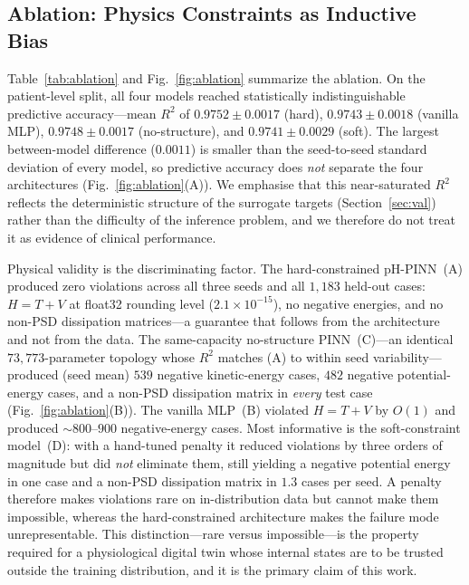 \documentclass[journal]{IEEEtran}
\begin{document}

\subsection{Ablation: Physics Constraints as Inductive Bias}\label{sec:ablres}
Table~\ref{tab:ablation} and Fig.~\ref{fig:ablation} summarize the ablation. On the patient-level split, all four models reached statistically indistinguishable predictive accuracy---mean $R^2$ of $0.9752\pm0.0017$ (hard), $0.9743\pm0.0018$ (vanilla MLP), $0.9748\pm0.0017$ (no-structure), and $0.9741\pm0.0029$ (soft). The largest between-model difference ($0.0011$) is smaller than the seed-to-seed standard deviation of every model, so predictive accuracy does \emph{not} separate the four architectures (Fig.~\ref{fig:ablation}(A)). We emphasise that this near-saturated $R^2$ reflects the deterministic structure of the surrogate targets (Section~\ref{sec:val}) rather than the difficulty of the inference problem, and we therefore do not treat it as evidence of clinical performance.

Physical validity is the discriminating factor. The hard-constrained pH-PINN~(A) produced zero violations across all three seeds and all $1{,}183$ held-out cases: $H=T+V$ at float32 rounding level ($2.1\times10^{-15}$), no negative energies, and no non-PSD dissipation matrices---a guarantee that follows from the architecture and not from the data. The same-capacity no-structure PINN~(C)---an identical $73{,}773$-parameter topology whose $R^2$ matches (A) to within seed variability---produced (seed mean) $539$ negative kinetic-energy cases, $482$ negative potential-energy cases, and a non-PSD dissipation matrix in \emph{every} test case (Fig.~\ref{fig:ablation}(B)). The vanilla MLP~(B) violated $H=T+V$ by $O(1)$ and produced ${\sim}800$--$900$ negative-energy cases. Most informative is the soft-constraint model~(D): with a hand-tuned penalty it reduced violations by three orders of magnitude but did \emph{not} eliminate them, still yielding a negative potential energy in one case and a non-PSD dissipation matrix in $1.3$ cases per seed. A penalty therefore makes violations rare on in-distribution data but cannot make them impossible, whereas the hard-constrained architecture makes the failure mode unrepresentable. This distinction---rare versus impossible---is the property required for a physiological digital twin whose internal states are to be trusted outside the training distribution, and it is the primary claim of this work.
\end{document}
